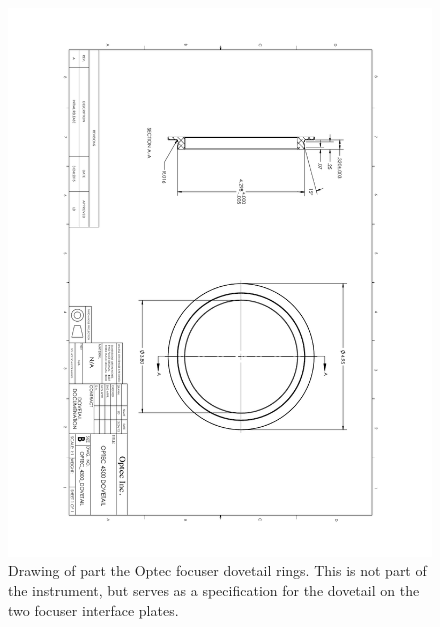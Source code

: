 \begin{figure}
\begin{center}
\includegraphics[angle=180,width=0.9\linewidth]{figures/huitzi-f20-dovetail.pdf}
\end{center}
\caption{Drawing of part the Optec focuser dovetail rings. This is not part of the instrument, but serves as a specification for the dovetail on the two focuser interface plates.}
\label{figure:huitzi-f20-dovetail}
\end{figure}

